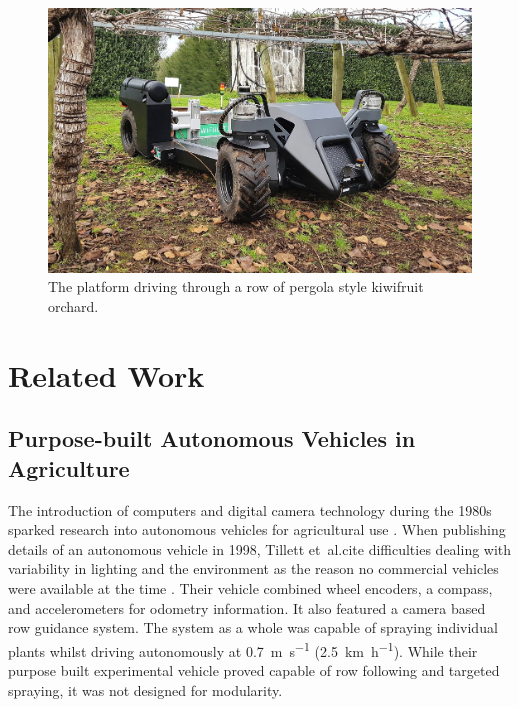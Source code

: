 \documentclass[preprint,authoryear,12pt]{elsarticle}
\begin{document}
    \begin{figure}[htb]
        \centering
        \includegraphics[width=\linewidth]{imgs/photos/suzy_general.jpg}
        \caption{
            The platform driving through a row of pergola style kiwifruit orchard.
        }
        \label{fig:suzy}
    \end{figure}


\section{Related Work}
\label{sect:review}

    \subsection{Purpose-built Autonomous Vehicles in Agriculture}

        The introduction of computers and digital camera technology during the 1980s sparked research into autonomous vehicles for agricultural use \citep{Li2009}.
        When publishing details of an autonomous vehicle in 1998, Tillett et~al.\@ cite difficulties dealing with variability in lighting and the environment as the reason no commercial vehicles were available at the time \citep{Tillett1998}.
        Their vehicle combined wheel encoders, a compass, and accelerometers for odometry information.
        It also featured a camera based row guidance system.
        The system as a whole was capable of spraying individual plants whilst driving autonomously at \SI{0.7}{\meter\per\second} (\SI{2.5}{\kilo\meter\per\hour}).
        While their purpose built experimental vehicle proved capable of row following and targeted spraying, it was not designed for modularity.
\end{document}
